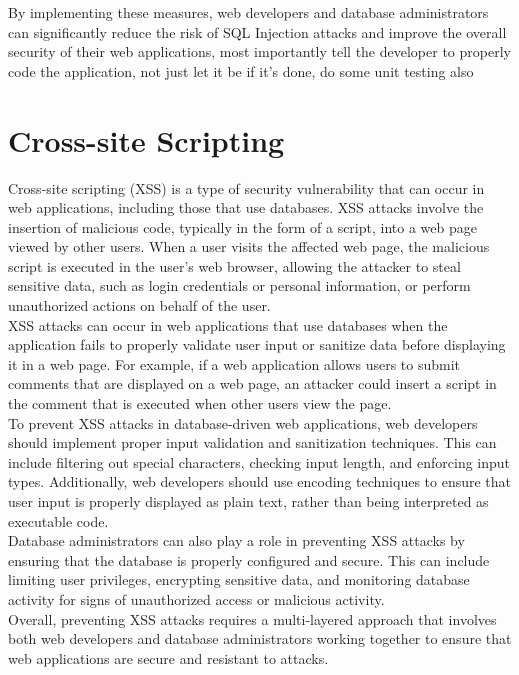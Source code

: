 \documentclass[11pt]{article}
\let\oldsection\section
\renewcommand\section{\clearpage\oldsection}
\begin{document}
By implementing these measures, web developers and database administrators can significantly reduce the risk of SQL Injection attacks and improve the overall security of their web applications, most importantly tell the developer to properly code the application, not just let it be if it's done, do some unit testing also\\

\section{Cross-site Scripting}
\label{sec:org33d4c8a}

Cross-site scripting (XSS) is a type of security vulnerability that can occur in web applications, including those that use databases. XSS attacks involve the insertion of malicious code, typically in the form of a script, into a web page viewed by other users. When a user visits the affected web page, the malicious script is executed in the user's web browser, allowing the attacker to steal sensitive data, such as login credentials or personal information, or perform unauthorized actions on behalf of the user.\\

XSS attacks can occur in web applications that use databases when the application fails to properly validate user input or sanitize data before displaying it in a web page. For example, if a web application allows users to submit comments that are displayed on a web page, an attacker could insert a script in the comment that is executed when other users view the page.\\

To prevent XSS attacks in database-driven web applications, web developers should implement proper input validation and sanitization techniques. This can include filtering out special characters, checking input length, and enforcing input types. Additionally, web developers should use encoding techniques to ensure that user input is properly displayed as plain text, rather than being interpreted as executable code.\\

Database administrators can also play a role in preventing XSS attacks by ensuring that the database is properly configured and secure. This can include limiting user privileges, encrypting sensitive data, and monitoring database activity for signs of unauthorized access or malicious activity.\\

Overall, preventing XSS attacks requires a multi-layered approach that involves both web developers and database administrators working together to ensure that web applications are secure and resistant to attacks.\\
\end{document}

